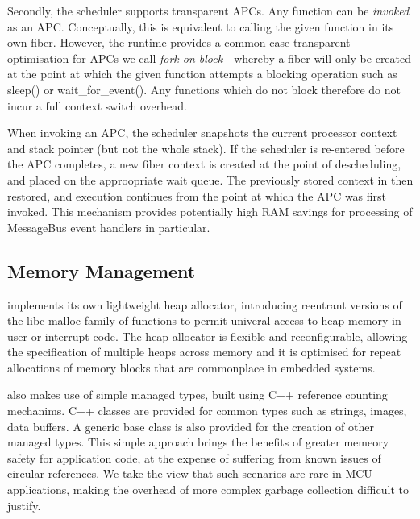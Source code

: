 Secondly, the \CO scheduler supports transparent APCs. Any function can be \emph{invoked} as an APC. Conceptually, this is equivalent to calling the given function in its own fiber. However, the \CO runtime provides a common-case transparent optimisation for APCs we call \emph{fork-on-block} - whereby a fiber will only be created at the point at which the given function attempts a blocking operation such as sleep() or wait\_for\_event(). Any functions which do not block therefore do not incur a full context switch overhead. 

When invoking an APC, the scheduler snapshots the current processor context and stack pointer (but not the whole stack). If the scheduler is re-entered before the APC completes, a new fiber context is created at the point of descheduling, and placed on the approopriate wait queue. The previously stored context in then restored, and execution continues from the point at which the APC was first invoked. This mechanism provides potentially high RAM savings for processing of MessageBus event handlers in particular.

\subsection{Memory Management}
\CO implements its own lightweight heap allocator, introducing reentrant versions of the libc malloc family of functions to permit univeral access to heap memory in user or interrupt code. The heap allocator is flexible and reconfigurable, allowing the specification of multiple heaps across memory and it is optimised for repeat allocations of memory blocks that are commonplace in embedded systems.

\CO also makes use of simple managed types, built using C++ reference counting mechanims. C++ classes are provided for common types such as strings, images, data buffers. A generic base class is also provided for the creation of other managed types. This simple approach brings the benefits of greater memeory safety for application code, at the expense of suffering from known issues of circular references. We take the view that such scenarios are rare in MCU applications, making the overhead of more complex garbage collection difficult to justify.

